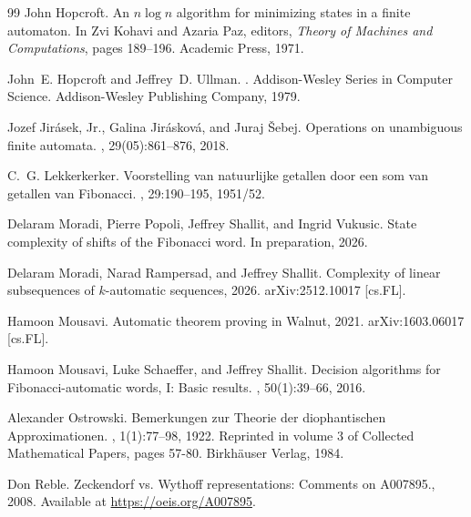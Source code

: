 \documentclass[12pt,reqno]{article}
\begin{document}
\begin{thebibliography}{99}
John Hopcroft.
\newblock An $n \log n$ algorithm for minimizing states in a finite automaton.
\newblock In Zvi Kohavi and Azaria Paz, editors, {\em Theory of {Machines} and
  {Computations}}, pages 189--196. Academic Press, 1971.

John~E. Hopcroft and Jeffrey~D. Ullman.
.
\newblock Addison-{Wesley} {Series} in {Computer} {Science}. Addison-Wesley
  Publishing Company, 1979.

{Jozef Jir{\'a}sek, Jr.}, {Galina Jir{\'a}skov{\'a}}, and {Juraj {\v S}ebej}.
\newblock Operations on unambiguous finite automata.
,
  29(05):861--876, 2018.

C.~G. Lekkerkerker.
\newblock Voorstelling van natuurlijke getallen door een som van getallen van
  {Fibonacci}.
, 29:190--195, 1951/52.

Delaram Moradi, Pierre Popoli, Jeffrey Shallit, and Ingrid Vukusic.
\newblock State complexity of shifts of the {Fibonacci} word.
\newblock In preparation, 2026.

Delaram Moradi, Narad Rampersad, and Jeffrey Shallit.
\newblock Complexity of linear subsequences of $k$-automatic sequences, 2026.
\newblock arXiv:2512.10017 [cs.FL].

Hamoon Mousavi.
\newblock Automatic theorem proving in {Walnut}, 2021.
\newblock arXiv:1603.06017 [cs.FL].

Hamoon Mousavi, Luke Schaeffer, and Jeffrey Shallit.
\newblock Decision algorithms for {Fibonacci}-automatic words, {I}: Basic
  results.
, 50(1):39--66,
  2016.

Alexander Ostrowski.
\newblock Bemerkungen zur {Theorie} der diophantischen {Approximationen}.
, 1(1):77--98, 1922.
\newblock Reprinted in volume 3 of Collected Mathematical Papers, pages 57-80.
  Birkh{\"a}user Verlag, 1984.

Don Reble.
\newblock Zeckendorf vs. {Wythoff} representations: Comments on {A007895}.,
  2008.
\newblock Available at \url{https://oeis.org/A007895}.


\end{thebibliography}
\end{document}
